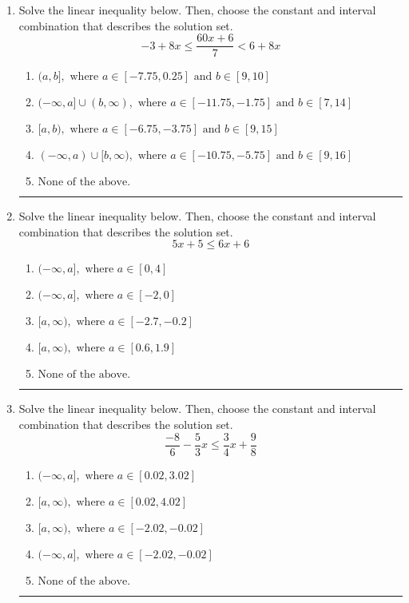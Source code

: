 \documentclass[14pt]{extbook}
\newcommand{\litem}[1]{\item#1\hspace*{-1cm}\rule{\textwidth}{0.4pt}}
\begin{document}
\begin{enumerate}
\litem{
Solve the linear inequality below. Then, choose the constant and interval combination that describes the solution set.\[ -3 + 8 x \leq \frac{60 x + 6}{7} < 6 + 8 x \]\begin{enumerate}[label=\Alph*.]
\item \( (a, b], \text{ where } a \in [-7.75, 0.25] \text{ and } b \in [9, 10] \)
\item \( (-\infty, a] \cup (b, \infty), \text{ where } a \in [-11.75, -1.75] \text{ and } b \in [7, 14] \)
\item \( [a, b), \text{ where } a \in [-6.75, -3.75] \text{ and } b \in [9, 15] \)
\item \( (-\infty, a) \cup [b, \infty), \text{ where } a \in [-10.75, -5.75] \text{ and } b \in [9, 16] \)
\item \( \text{None of the above.} \)

\end{enumerate} }
\litem{
Solve the linear inequality below. Then, choose the constant and interval combination that describes the solution set.\[ 5x + 5 \leq 6x + 6 \]\begin{enumerate}[label=\Alph*.]
\item \( (-\infty, a], \text{ where } a \in [0, 4] \)
\item \( (-\infty, a], \text{ where } a \in [-2, 0] \)
\item \( [a, \infty), \text{ where } a \in [-2.7, -0.2] \)
\item \( [a, \infty), \text{ where } a \in [0.6, 1.9] \)
\item \( \text{None of the above}. \)

\end{enumerate} }
\litem{
Solve the linear inequality below. Then, choose the constant and interval combination that describes the solution set.\[ \frac{-8}{6} - \frac{5}{3} x \leq \frac{3}{4} x + \frac{9}{8} \]\begin{enumerate}[label=\Alph*.]
\item \( (-\infty, a], \text{ where } a \in [0.02, 3.02] \)
\item \( [a, \infty), \text{ where } a \in [0.02, 4.02] \)
\item \( [a, \infty), \text{ where } a \in [-2.02, -0.02] \)
\item \( (-\infty, a], \text{ where } a \in [-2.02, -0.02] \)
\item \( \text{None of the above}. \)


\end{enumerate}}
\end{enumerate}
\end{document}
